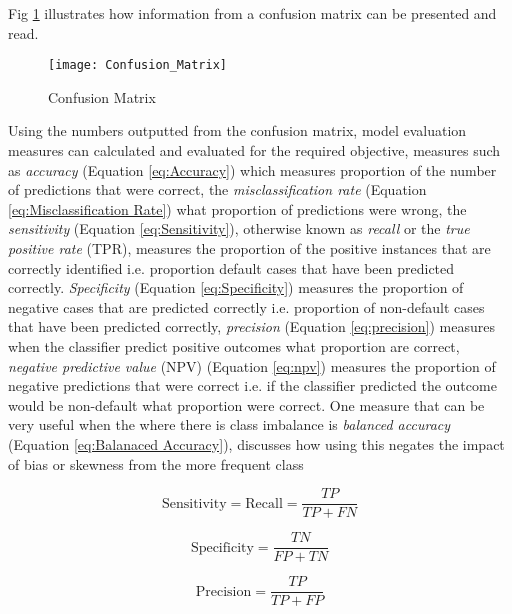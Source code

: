 Fig \ref{fig:ConfusionMatrix} illustrates how information from a confusion matrix can be presented and read.

\begin{figure}[H]
	\texttt{[image: Confusion\_Matrix]}
	\caption[Confusion Matrix]
	{Confusion Matrix}
	\label{fig:ConfusionMatrix}
\end{figure}

Using the numbers outputted from the confusion matrix, model evaluation measures can calculated and evaluated for the required objective, measures such as \textit{accuracy} (Equation \ref{eq:Accuracy}) which measures proportion of the number of predictions that were correct, the \textit{misclassification rate} (Equation \ref{eq:Misclassification Rate}) what proportion of predictions were wrong, the \textit{sensitivity} (Equation \ref{eq:Sensitivity}), otherwise known as \textit{recall} or the \textit{true positive rate} (TPR), measures the proportion of the positive instances that are correctly identified i.e. proportion default cases that have been predicted correctly. \textit{Specificity} (Equation \ref{eq:Specificity}) measures the proportion of negative cases that are predicted correctly i.e. proportion of non-default cases that have been predicted correctly, \textit{precision} (Equation \ref{eq:precision}) measures when the classifier predict positive outcomes what proportion are correct, \textit{negative predictive value} (NPV) (Equation \ref{eq:npv}) measures the proportion of negative predictions that were correct i.e. if the classifier predicted the outcome would be non-default what proportion were correct. One measure that can be very useful when the where there is class imbalance is \textit{balanced accuracy} (Equation \ref{eq:Balanaced Accuracy}), \citep{brodersen_balanced_2010} discusses how using this negates the impact of bias or skewness from the more frequent class

\begin{equation} \label{eq:Sensitivity}
\text{Sensitivity} = \text{Recall} = \frac{TP}{TP + FN}
\end{equation}

\begin{equation} \label{eq:Specificity}
\text{Specificity} = \frac{TN}{FP + TN}
\end{equation}

\begin{equation} \label{eq:precision}
\text{Precision} = \frac{TP}{TP + FP}
\end{equation}

